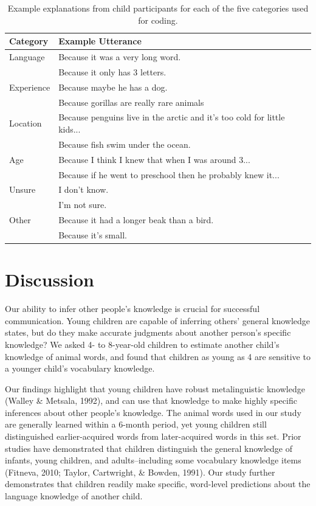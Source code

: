 \documentclass[10pt, letterpaper]{article}
\begin{document}
\begin{table}[tb]
\centering
\begin{tabular}{ll}
  \hline
Category & Example Utterance \\ 
  \hline
Language & Because it was a very long word. \\ 
    & Because it only has 3 letters. \\ 
  Experience & Because maybe he has a dog. \\ 
    & Because gorillas are really rare animals \\ 
  Location & Because penguins live in the arctic and it's too cold for little kids... \\ 
    & Because fish swim under the ocean. \\ 
  Age & Because I think I knew that when I was around 3... \\ 
    & Because if he went to preschool then he probably knew it... \\ 
  Unsure & I don't know. \\ 
    & I'm not sure. \\ 
  Other & Because it had a longer beak than a bird. \\ 
    & Because it's small. \\ 
   \hline
\end{tabular}
\caption{Example explanations from child participants for each of the five categories used for coding.} 
\label{tab:explanations_table}
\end{table}

\hypertarget{discussion}{%
\section{Discussion}\label{discussion}}

Our ability to infer other people's knowledge is crucial for successful
communication. Young children are capable of inferring others' general
knowledge states, but do they make accurate judgments about another
person's specific knowledge? We asked 4- to 8-year-old children to
estimate another child's knowledge of animal words, and found that
children as young as 4 are sensitive to a younger child's vocabulary
knowledge.

Our findings highlight that young children have robust metalinguistic
knowledge (Walley \& Metsala, 1992), and can use that knowledge to make
highly specific inferences about other people's knowledge. The animal
words used in our study are generally learned within a 6-month period,
yet young children still distinguished earlier-acquired words from
later-acquired words in this set. Prior studies have demonstrated that
children distinguish the general knowledge of infants, young children,
and adults--including some vocabulary knowledge items (Fitneva, 2010;
Taylor, Cartwright, \& Bowden, 1991). Our study further demonstrates
that children readily make specific, word-level predictions about the
language knowledge of another child.
\end{document}
